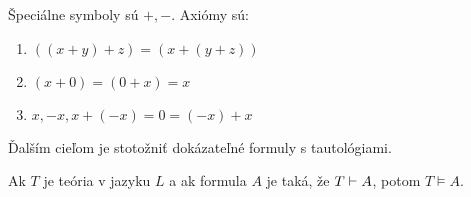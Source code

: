 \begin{priklad}
    Špeciálne symboly sú $+,-$.
    Axiómy sú:
    \begin{enumerate}
            \item $((x+y)+z) = (x+(y+z))$
            \item $(x+0) = (0+x) = x$
            \item $x, -x, x+(-x) = 0 = (-x)+x$
    \end{enumerate}
\end{priklad}

Ďalším cieľom je stotožniť dokázateľné formuly s tautológiami.
\stopFIXME

\begin{veta}[O korektnosti]
    Ak $T$ je teória v jazyku $L$ a ak formula $A$ je taká,
    že $T \vdash A$, potom $T \models A$.
\end{veta}

